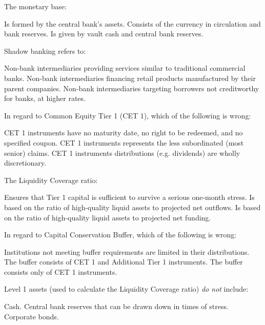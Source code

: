 \documentclass{exam}
\begin{document}
\begin{questions}
\question
The monetary base:
\begin{choices}
\choice Is formed  by the central bank's assets.
\CorrectChoice Consists of the currency in circulation and bank reserves.
\choice Is given by vault cash and central bank reserves.
\end{choices}

\question
Shadow banking refers to:
\begin{choices}
\CorrectChoice Non-bank intermediaries providing services similar to traditional commercial banks.
\choice Non-bank intermediaries financing retail products manufactured by their parent companies.
\choice Non-bank intermediaries targeting borrowers not creditworthy for banks, at higher rates.
\end{choices}

\question
In regard to Common Equity Tier 1 (CET 1), which of the following is wrong:
\begin{choices}
\choice CET 1 instruments have no maturity date, no right to be redeemed, and no specified coupon.
\CorrectChoice CET 1 instruments represents the less subordinated (most senior) claims.
\choice CET 1 instruments distributions (e.g. dividends) are wholly discretionary.
\end{choices}

\question
The Liquidity Coverage ratio:
\begin{choices}
\choice Ensures that Tier 1 capital is sufficient to survive a serious one-month stress.
\CorrectChoice Is based on the ratio of high-quality liquid assets to projected net outflows.
\choice Is based on the ratio of high-quality liquid assets to projected net funding.
\end{choices}

\question
In regard to Capital Conservation Buffer, which of the following is wrong:
\begin{choices}
\choice Institutions not meeting buffer requirements are limited in their distributions.
\CorrectChoice The buffer consists of CET 1 and Additional Tier 1 instruments.
\choice The buffer consists only of CET 1 instruments.
\end{choices}

\question
Level 1 assets (used to calculate the Liquidity Coverage ratio) \emph{do not} include:
\begin{choices}
\choice Cash.
\choice Central bank reserves that can be drawn down in times of stress.
\CorrectChoice Corporate bonds.
\end{choices}
  
\end{questions}
\end{document}
